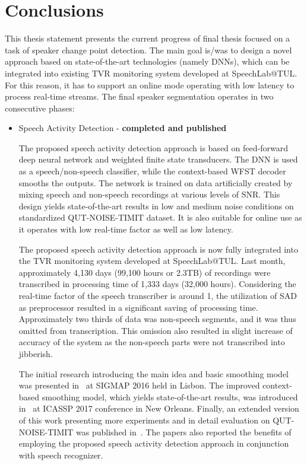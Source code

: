 \documentclass[FM,noheader,EN,bwtitles]{tulthesis}
\begin{document}
\chapter{Conclusions}
\label{ch:conclusions}

This thesis statement presents the current progress of final thesis focused on a task of speaker change point detection.
The main goal is/was to design a novel approach based on state-of-the-art technologies (namely DNNs), which can be integrated into existing TVR monitoring system developed at SpeechLab@TUL.
For this reason, it has to support an online mode operating with low latency to process real-time streams.
The final speaker segmentation operates in two consecutive phases:

\begin{itemize}
	\item Speech Activity Detection - \textbf{completed and published}
	
	The proposed speech activity detection approach is based on feed-forward deep neural network and weighted finite state transducers.
	The DNN is used as a speech/non-speech classifier, while the context-based WFST decoder smooths the outputs.
	The network is trained on data artificially created by mixing speech and non-speech recordings at various levels of SNR.
	This design yields state-of-the-art results in low and medium noise conditions on standardized QUT-NOISE-TIMIT dataset.
	It is also suitable for online use as it operates with low real-time factor as well as low latency.

	The proposed speech activity detection approach is now fully integrated into the TVR monitoring system developed at SpeechLab@TUL.
	Last month, approximately 4,130 days (99,100 hours or 2.3TB) of recordings were transcribed in processing time of 1,333 days (32,000 hours).
	Considering the real-time factor of the speech transcriber is around 1, the utilization of SAD as preprocessor resulted in a significant saving of processing time.
	Approximately two thirds of data was non-speech segments, and it was thus omitted from transcription.
	This omission also resulted in slight increase of accuracy of the system as the non-speech parts were not transcribed into jibberish.

	The initial research introducing the main idea and basic smoothing model was presented in~\parencite{SIGMAP16} at SIGMAP 2016 held in Lisbon.
	The improved context-based smoothing model, which yields state-of-the-art results, was introduced in~\parencite{ICASSP17} at ICASSP 2017 conference in New Orleans.
	Finally, an extended version of this work presenting more experiments and in detail evaluation on QUT-NOISE-TIMIT was published in~\parencite{SPRINGER17}.
	The papers also reported the benefits of employing the proposed speech activity detection approach in conjunction with speech recognizer.
	

\end{itemize}
\end{document}
